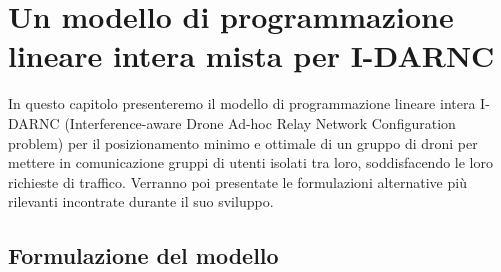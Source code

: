  \chapter{Un modello di programmazione lineare intera mista per I-DARNC} \label{chap:modello}
In questo capitolo presenteremo il modello di programmazione lineare intera I-DARNC (Interference-aware Drone Ad-hoc Relay Network Configuration problem) per il posizionamento minimo e ottimale di un gruppo di droni per mettere in comunicazione gruppi di utenti isolati tra loro, soddisfacendo le loro richieste di traffico. Verranno poi presentate le formulazioni alternative più rilevanti incontrate durante il suo sviluppo.\\

\ifpdf
    \graphicspath{{Chapter5/Figs/Raster/}{Chapter5/Figs/PDF/}{Chapter5/Figs/}}
\else
    \graphicspath{{Chapter5/Figs/Vector/}{Chapter5/Figs/}}
\fi

\section{Formulazione del modello}

